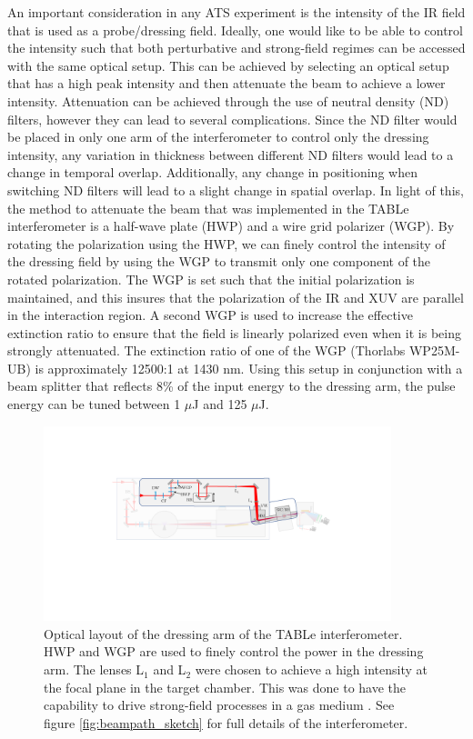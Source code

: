 An important consideration in any ATS experiment is the intensity of the IR field that is used as a probe/dressing field. Ideally, one would like to be able to control the intensity such that both perturbative and strong-field regimes can be accessed with the same optical setup.  This can be achieved by selecting an optical setup that has a high peak intensity and then attenuate the beam 
to achieve a lower intensity.  Attenuation can be achieved through the use of neutral density (ND) filters, however they can lead to several complications.  Since the ND filter would be placed in only one arm of the interferometer to control only the dressing intensity, any variation in thickness between different ND filters would lead to a change in temporal overlap.  Additionally, any change in positioning when switching ND filters will lead to a slight change in spatial overlap. In light of this, the method to attenuate the beam that was implemented in the TABLe interferometer is a half-wave plate (HWP) and a wire grid polarizer (WGP).  By rotating the polarization using the HWP, we can finely control the intensity  of the dressing field by using the WGP to transmit only one component of the rotated polarization.  The WGP is set such that the initial polarization is maintained, and this insures that the polarization of the IR and XUV are parallel in the interaction region.  A second WGP is used to increase the effective extinction ratio to ensure that the field is linearly polarized even when it is being strongly attenuated.  The extinction ratio of one of the WGP (Thorlabs WP25M-UB) is approximately 12500:1 at 1430 nm.  Using this setup in conjunction with a beam splitter that reflects 8\% of the input energy to the dressing arm, the pulse energy can be tuned between 1 $\mu$J and 125 $\mu$J.

\begin{figure}
	\centering
	\includegraphics[width=0.9\textwidth]{figures/Beamline/dressing_arm.pdf}
	\caption[Optical layout of dressing arm]{Optical layout of the dressing arm of the TABLe interferometer. HWP and WGP are used to finely control the power in the dressing arm.  The lenses L$_1$ and L$_2$ were chosen to achieve a high intensity at the focal plane in the target chamber.  This was done to have the capability to drive strong-field processes in a gas medium \cite{kiesewetterDynamicsNearThresholdAttosecond2019}.  See figure \ref{fig:beampath_sketch} for full details of the interferometer.}
	\label{fig:dressing_arm}
\end{figure}

